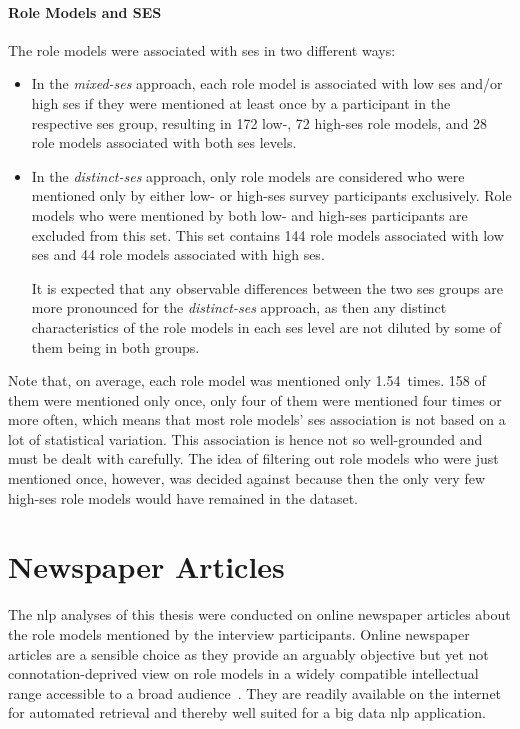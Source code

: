 \paragraph{Role Models and SES}
The role models were associated with \gls{ses} in two different ways:
\begin{itemize}
    \item In the \textit{mixed-\gls{ses}} approach, each role model is associated with low \gls{ses} and/or high \gls{ses} if they were mentioned at least once by a participant in the respective \gls{ses} group, resulting in \SI{172}{} low-, \SI{72}{} high-\gls{ses} role models, and \SI{28}{} role models associated with both \gls{ses} levels.

    \item In the \textit{distinct-\gls{ses}} approach, only role models are considered who were mentioned only by either low- or high-\gls{ses} survey participants exclusively. Role models who were mentioned by both low- and high-\gls{ses} participants are excluded from this set. This set contains \SI{144}{} role models associated with low \gls{ses} and \SI{44}{} role models associated with high \gls{ses}.
    
    It is expected that any observable differences between the two \gls{ses} groups are more pronounced for the \textit{distinct-\gls{ses}} approach, as then any distinct characteristics of the role models in each \gls{ses} level are not diluted by some of them being in both groups.
\end{itemize}

Note that, on average, each role model was mentioned only \SI{1.54}{times}. \SI{158}{} of them were mentioned only once, only four of them were mentioned four times or more often, which means that most role models' \gls{ses} association is not based on a lot of statistical variation. This association is hence not so well-grounded and must be dealt with carefully. The idea of filtering out role models who were just mentioned once, however, was decided against because then the only very few high-\gls{ses} role models would have remained in the dataset.


\section{Newspaper Articles}
The \gls{nlp} analyses of this thesis were conducted on online newspaper articles about the role models mentioned by the interview participants. Online newspaper articles are a sensible choice as they provide an arguably objective but yet not connotation-deprived view on role models in a  widely compatible intellectual range accessible to a broad audience~\autocite{dubied_studying_2014}. They are readily available on the internet for automated retrieval and thereby well suited for a big data \gls{nlp} application.

